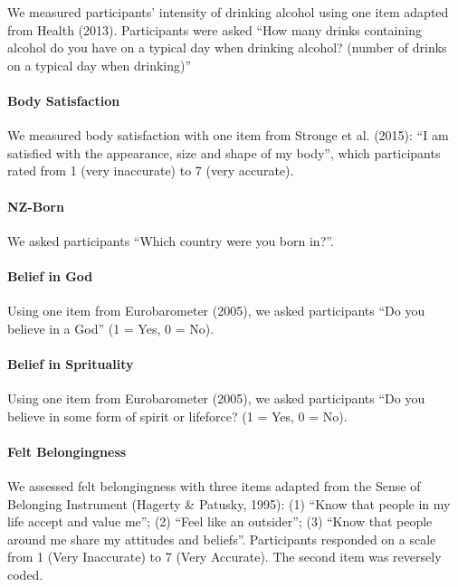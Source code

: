 \documentclass[
  letterpaper,
  DIV=11,
  numbers=noendperiod]{scrartcl}
\let\oldparagraph\paragraph
\renewcommand{\paragraph}[1]{\oldparagraph{#1}\mbox{}}
\begin{document}
We measured participants' intensity of drinking alcohol using one item
adapted from Health (2013). Participants were asked ``How many drinks
containing alcohol do you have on a typical day when drinking alcohol?
(number of drinks on a typical day when drinking)''

\hypertarget{body-satisfaction}{%
\paragraph{Body Satisfaction}\label{body-satisfaction}}

We measured body satisfaction with one item from Stronge et al. (2015):
``I am satisfied with the appearance, size and shape of my body'', which
participants rated from 1 (very inaccurate) to 7 (very accurate).

\hypertarget{nz-born}{%
\paragraph{NZ-Born}\label{nz-born}}

We asked participants ``Which country were you born in?''.

\hypertarget{belief-in-god}{%
\paragraph{Belief in God}\label{belief-in-god}}

Using one item from Eurobarometer (2005), we asked participants ``Do you
believe in a God'' (1 = Yes, 0 = No).

\hypertarget{belief-in-sprituality}{%
\paragraph{Belief in Sprituality}\label{belief-in-sprituality}}

Using one item from Eurobarometer (2005), we asked participants ``Do you
believe in some form of spirit or lifeforce? (1 = Yes, 0 = No).

\hypertarget{felt-belongingness}{%
\paragraph{Felt Belongingness}\label{felt-belongingness}}

We assessed felt belongingness with three items adapted from the Sense
of Belonging Instrument (Hagerty \& Patusky, 1995): (1) ``Know that
people in my life accept and value me''; (2) ``Feel like an outsider'';
(3) ``Know that people around me share my attitudes and beliefs''.
Participants responded on a scale from 1 (Very Inaccurate) to 7 (Very
Accurate). The second item was reversely coded.
\end{document}
